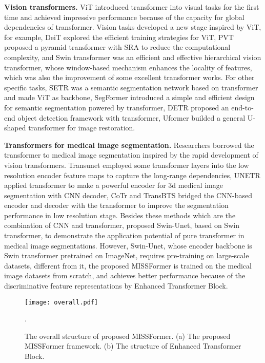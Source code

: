 \documentclass[letterpaper]{article} \usepackage{aaai22}  \usepackage{times}  \usepackage{helvet}  \usepackage{courier}  \usepackage[hyphens]{url}  \usepackage{graphicx} \urlstyle{rm} \def\UrlFont{\rm}  \usepackage{natbib}  \usepackage{caption} \DeclareCaptionStyle{ruled}{labelfont=normalfont,labelsep=colon,strut=off} \frenchspacing  \setlength{\pdfpagewidth}{8.5in}  \setlength{\pdfpageheight}{11in}  \usepackage{algorithm}
\begin{document}
\textbf{Vision transformers.} ViT\cite{Dosovitskiy2020} introduced transformer\cite{vaswani2017attention} into visual tasks for the first time and achieved impressive performance because of the capacity for global dependencies of transformer. Vision tasks developed a new stage inspired by ViT, for example, DeiT\cite{touvron2021training} explored the efficient training strategies for ViT, PVT\cite{Wang2021} proposed a pyramid transformer with SRA to reduce the computational complexity, and Swin transformer\cite{Liu2021} was an efficient and effective hierarchical vision transformer, whose window-based mechanism enhances the locality of features, which was also the improvement of some excellent transformer works\cite{Islam2020,Chu2021a,Li2021}. For other specific tasks, SETR\cite{Zheng2021} was a semantic segmentation network based on transformer and made ViT as backbone, SegFormer\cite{Xie2021a} introduced a simple and efficient design for semantic segmentation powered by transformer, DETR\cite{Carion2020} proposed an end-to-end object detection framework with transformer, Uformer\cite{Wang2021a} builded a general U-shaped transformer for image restoration.

\textbf{Transformers for medical image segmentation.} Researchers borrowed the transformer to medical image segmentation inspired by the rapid development of vision transformers. Transunet\cite{Chen2021} employed some transformer layers into the low resolution encoder feature maps to capture the long-range dependencies, UNETR\cite{Hatamizadeh2021} applied transformer to make a powerful encoder for 3d medical image segmentation with CNN decoder, CoTr\cite{Xie2021} and TransBTS\cite{Wang2021c} bridged the CNN-based encoder and decoder with the transformer to improve the segmentation performance in low resolution stage. Besides these methods which are the combination of CNN and transformer, \cite{Cao2021} proposed Swin-Unet, based on Swin transformer\cite{Liu2021}, to demonstrate the application potential of pure transformer in medical image segmentations. However, Swin-Unet, whose encoder backbone is Swin transformer pretrained on ImageNet, requires pre-training on large-scale datasets, different from it, the proposed MISSFormer is trained on the medical image datasets from scratch, and achieves better performance because of the discriminative feature representations by Enhanced Transformer Block. 
\begin{figure*}[t]
	\centering
	\texttt{[image: overall.pdf]} \caption{The overall structure of proposed MISSFormer. (a) The proposed MISSFormer framework. (b) The structure of Enhanced Transformer Block.}.
	\label{fig1}
\end{figure*}
\end{document}

